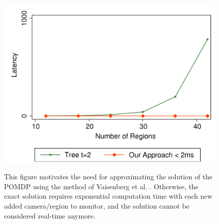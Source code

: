 \documentclass[a4paper,11pt,english]{article}
\begin{document}
\begin{figure}[H]
  \caption{
  This figure motivates the need for approximating the solution of the POMDP using the method of Vaisenberg et al. \cite{vaisenberg2014scheduling}. Otherwise, the exact solution requires exponential computation time with each new added camera/region to monitor, and the solution cannot be considered real-time anymore.}
  \centering
    \includegraphics[scale=0.4]{vaisenbergevaluation2.png}
  \label{vaisenbergevaluation2}
\end{figure}
\end{document}
